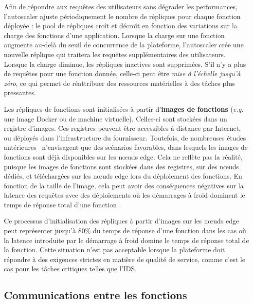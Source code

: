 Afin de répondre aux requêtes des utilisateurs sans dégrader les performances, l'autoscaler ajuste périodiquement le nombre de répliques pour chaque fonction déployée : le pool de répliques croît et décroît en fonction des variations sur la charge des fonctions d'une application. Lorsque la charge sur une fonction augmente au-delà du seuil de concurrence de la plateforme, l'autoscaler crée une nouvelle réplique qui traitera les requêtes supplémentaires des utilisateurs. Lorsque la charge diminue, les répliques inactives sont supprimées. S'il n'y a plus de requêtes pour une fonction donnée, celle-ci peut être \textit{mise à l'échelle jusqu'à zéro}, ce qui permet de réattribuer des ressources matérielles à des tâches plus pressantes.

Les répliques de fonctions sont initialisées à partir d'\textbf{images de fonctions} (\textit{e.g.} une image Docker ou de machine virtuelle). Celles-ci sont stockées dans un registre d'images. Ces registres peuvent être accessibles à distance par Internet, ou déployés dans l'infrastructure du fournisseur. Toutefois, de nombreuses études antérieures~\cite{bhasiCypressInputSizesensitive2022, zijunFassflowEfficient2022, smithFaDOFaaSFunctions2022, zhangFIRSTExploitingMultiDimensional2023} n'envisagent que des scénarios favorables, dans lesquels les images de fonctions sont déjà disponibles sur les nœuds edge. Cela ne reflète pas la réalité, puisque les images de fonctions sont stockées dans des registres, sur des nœuds dédiés, et téléchargées sur les nœuds edge lors du déploiement des fonctions. En fonction de la taille de l'image, cela peut avoir des conséquences négatives sur la latence des requêtes avec des déploiements où les démarrages à froid dominent le temps de réponse total d'une fonction \cite{yanHermesEfficientCache2020}.

Ce processus d'initialisation des répliques à partir d'images sur les nœuds edge peut représenter jusqu'à 80\% du temps de réponse d'une fonction \cite{yanHermesEfficientCache2020} dans les cas où la latence introduite par le démarrage à froid domine le temps de réponse total de la fonction. Cette situation n'est pas acceptable lorsque la plateforme doit répondre à des exigences strictes en matière de qualité de service, comme c'est le cas pour les tâches critiques telles que l'IDS.

\subsection{Communications entre les fonctions}
\label{section:herocache-background-communications}

